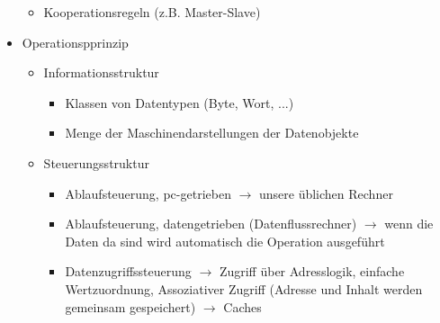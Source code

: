 \begin{itemize}
\begin{itemize}
\begin{itemize}
\begin{itemize}
				\end{itemize}
			\end{itemize}
			\item Kooperationsregeln (z.B. Master-Slave)
		\end{itemize}
		\item Operationspprinzip
		\begin{itemize}
			\item Informationsstruktur
			\begin{itemize}
				\item Klassen von Datentypen (Byte, Wort, ...)
				\item Menge der Maschinendarstellungen der Datenobjekte
			\end{itemize}
			\item Steuerungsstruktur
			\begin{itemize}
				\item Ablaufsteuerung, pc-getrieben \(\to\) unsere üblichen Rechner 
				\item Ablaufsteuerung, datengetrieben (Datenflussrechner) \(\to\) wenn die Daten da sind wird automatisch die Operation ausgeführt
				\item Datenzugriffssteuerung  \(\to\) Zugriff über Adresslogik, einfache Wertzuordnung, Assoziativer Zugriff (Adresse und Inhalt werden gemeinsam gespeichert) \(\to\) Caches
			\end{itemize}
		\end{itemize}
	\end{itemize}

